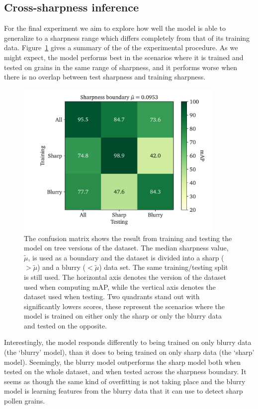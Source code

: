 \subsection{Cross-sharpness inference}
For the final experiment we aim to explore how well the model is able to generalize to a sharpness range which differs completely from that of its training data.
Figure~\ref{fig:results-sharpness-inference} gives a summary of the of the experimental procedure.
As we might expect, the model performs best in the scenarios where it is trained and tested on grains in the same range of sharpness, and it performs worse when there is no overlap between test sharpness and training sharpness.

\begin{figure}[htbp]
  \centering
  \includegraphics[width=0.9\textwidth]{figs/results/sharpness/confustion_balanced_test_map.pdf}
  \caption[mAP across sharpness boundary]{%
The confusion matrix shows the result from training and testing the model on tree versions of the dataset. 
The median sharpness value, \(\tilde{\mu}\), is used as a boundary and the dataset is divided into a sharp (\(>\tilde{\mu}\)) and a blurry (\(<\tilde{\mu}\)) data set.
The same training/testing split is still used. 
The horizontal axis denotes the version of the dataset used when computing mAP, while the vertical axis denotes the dataset used when testing.
Two quadrants stand out with significantly lowers scores,  these represent the scenarios where the model is trained on either only the sharp or only the blurry data and tested on the opposite.
  }\label{fig:results-sharpness-inference}
\end{figure}

Interestingly, the model responds differently to being trained on only blurry data (the `blurry' model), than it does to being trained on only sharp data (the `sharp' model).
Seemingly, the blurry model outperforms the sharp model both when tested on the whole dataset, and when tested across the sharpness boundary.
It seems as though the same kind of overfitting is not taking place and the blurry model is learning features from the blurry data that it can use to detect sharp pollen grains.

